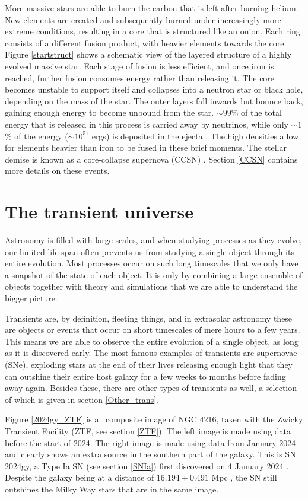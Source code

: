 \documentclass[a4paper,oneside,12pt, class=Latex/Classes/PhDthesisPSnPDF, crop=false]{standalone}
\begin{document}
More massive stars are able to burn the carbon that is left after burning helium. New elements are created and subsequently burned under increasingly more extreme conditions, resulting in a core that is structured like an onion. Each ring consists of a different fusion product, with heavier elements towards the core. Figure \ref{startstruct} shows a schematic view of the layered structure of a highly evolved massive star. Each stage of fusion is less efficient, and once iron is reached, further fusion consumes energy rather than releasing it. The core becomes unstable to support itself and collapses into a neutron star or black hole, depending on the mass of the star. The outer layers fall inwards but bounce back, gaining enough energy to become unbound from the star. $\sim99$\% of the total energy that is released in this process is carried away by neutrinos, while only $\sim1$\% of the energy ($\sim10^{51}$ ergs) is deposited in the ejecta \citep{CCSN_neutrino_overview}. The high densities allow for elements heavier than iron to be fused in these brief moments. The stellar demise is known as a core-collapse supernova (CCSN) \citep{starstruct}. Section \ref{CCSN} contains more details on these events.


\section{The transient universe}
Astronomy is filled with large scales, and when studying processes as they evolve, our limited life span often prevents us from studying a single object through its entire evolution. Most processes occur on such long timescales that we only have a snapshot of the state of each object. It is only by combining a large ensemble of objects together with theory and simulations that we are able to understand the bigger picture.

Transients are, by definition, fleeting things, and in extrasolar astronomy these are objects or events that occur on short timescales of mere hours to a few years. This means we are able to observe the entire evolution of a single object, as long as it is discovered early. The most famous examples of transients are supernovae (SNe), exploding stars at the end of their lives releasing enough light that they can outshine their entire host galaxy for a few weeks to months before fading away again. Besides these, there are other types of transients as well, a selection of which is given in section \ref{Other_trans}.

Figure \ref{2024gy_ZTF} is a \ztfg\ztfr\ztfi\ composite image of NGC 4216, taken with the Zwicky Transient Facility (ZTF, see section \ref{ZTF}). The left image is made using data before the start of 2024. The right image is made using data from January 2024 and clearly shows an extra source in the southern part of the galaxy. This is SN 2024gy, a Type Ia SN (see section \ref{SNIa}) first discovered on 4 January 2024 \citep{2024gy_disc}. Despite the galaxy being at a distance of $16.194 \pm 0.491$ Mpc \citep{2024gy_z}, the SN still outshines the Milky Way stars that are in the same image.
\end{document}

